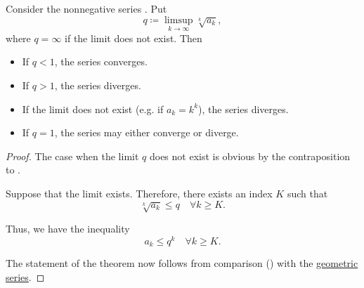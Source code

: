 \begin{proposition}\label{thm:cauchys_root_test}
  Consider the nonnegative series . Put
  \begin{equation*}
    q \coloneqq \limsup_{k \to \infty} \sqrt[k]{a_k},
  \end{equation*}
  where \( q = \infty \) if the limit does not exist. Then
  \begin{itemize}
    \item If \( q < 1 \), the series converges.
    \item If \( q > 1 \), the series diverges.
    \item If the limit does not exist (e.g. if \( a_k = k^k \)), the series diverges.
    \item If \( q = 1 \), the series may either converge or diverge.
  \end{itemize}
\end{proposition}
\begin{proof}
  The case when the limit \( q \) does not exist is obvious by the contraposition to .

  Suppose that the limit exists. Therefore, there exists an index \( K \) such that
  \begin{equation*}
    \sqrt[k]{a_k} \leq q \quad\forall k \geq K.
  \end{equation*}

  Thus, we have the inequality
  \begin{equation*}
    a_k \leq q^k \quad\forall k \geq K.
  \end{equation*}

  The statement of the theorem now follows from comparison () with the \hyperref[thm:geometric_series_properties/series]{geometric series}.
\end{proof}


